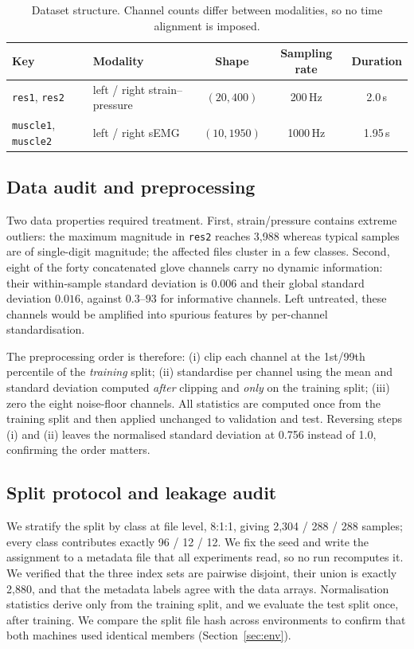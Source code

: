 \documentclass[11pt,a4paper]{article}
\begin{document}
\begin{table}[htbp]\centering
\caption{Dataset structure. Channel counts differ between modalities, so no time alignment is imposed.}
\label{tab:data}
\begin{tabular}{llccc}
\toprule
Key & Modality & Shape & Sampling rate & Duration \\
\midrule
\texttt{res1}, \texttt{res2} & left / right strain--pressure & $(20,400)$ & 200\,Hz & 2.0\,s \\
\texttt{muscle1}, \texttt{muscle2} & left / right sEMG & $(10,1950)$ & 1000\,Hz & 1.95\,s \\
\bottomrule
\end{tabular}
\end{table}

\subsection{Data audit and preprocessing}

Two data properties required treatment. First, strain/pressure contains extreme outliers: the maximum magnitude in \texttt{res2} reaches 3{,}988 whereas typical samples are of single-digit magnitude; the affected files cluster in a few classes. Second, eight of the forty concatenated glove channels carry no dynamic information: their within-sample standard deviation is $0.006$ and their global standard deviation $0.016$, against $0.3$--$93$ for informative channels. Left untreated, these channels would be amplified into spurious features by per-channel standardisation.

The preprocessing order is therefore: (i) clip each channel at the 1st/99th percentile of the \emph{training} split; (ii) standardise per channel using the mean and standard deviation computed \emph{after} clipping and \emph{only} on the training split; (iii) zero the eight noise-floor channels. All statistics are computed once from the training split and then applied unchanged to validation and test. Reversing steps (i) and (ii) leaves the normalised standard deviation at 0.756 instead of 1.0, confirming the order matters.

\subsection{Split protocol and leakage audit}

We stratify the split by class at file level, 8:1:1, giving 2{,}304 / 288 / 288 samples; every class contributes exactly 96 / 12 / 12. We fix the seed and write the assignment to a metadata file that all experiments read, so no run recomputes it. We verified that the three index sets are pairwise disjoint, their union is exactly 2{,}880, and that the metadata labels agree with the data arrays. Normalisation statistics derive only from the training split, and we evaluate the test split once, after training. We compare the split file hash across environments to confirm that both machines used identical members (Section~\ref{sec:env}).
\end{document}
